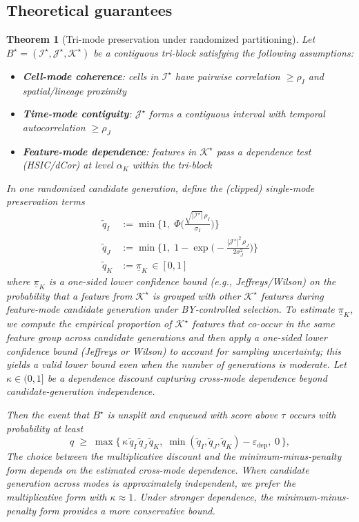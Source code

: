\documentclass[unnumsec,webpdf,modern,large,namedate]{oup-authoring-template}%
\theoremstyle{thmstyleone}\newtheorem{theorem}{Theorem}
\theoremstyle{thmstyletwo}\newtheorem{example}{Example}
\theoremstyle{thmstylethree}\newtheorem{definition}{Definition}
\begin{document}
\subsection{Theoretical guarantees}

\begin{theorem}[Tri-mode preservation under randomized partitioning]
\label{thm:trimode_preservation}
Let $B^\star=(\mathcal I^\star,\mathcal J^\star,\mathcal K^\star)$ be a contiguous tri-block satisfying the following assumptions:
\begin{itemize}
    \item[(A1)] \textbf{Cell-mode coherence}: cells in $\mathcal{I}^\star$ have pairwise correlation $\geq \rho_I$ and spatial/lineage proximity
    \item[(A2)] \textbf{Time-mode contiguity}: $\mathcal{J}^\star$ forms a contiguous interval with temporal autocorrelation $\geq \rho_J$
    \item[(A3)] \textbf{Feature-mode dependence}: features in $\mathcal{K}^\star$ pass a dependence test (HSIC/dCor) at level $\alpha_K$ within the tri-block
\end{itemize}

In one randomized candidate generation, define the (clipped) single-mode preservation terms
\begin{align}
\tilde q_I &:= \min\!\Big\{1,\; \Phi\!\Big(\tfrac{\sqrt{|\mathcal{I}^\star|} \, \rho_I}{\sigma_I}\Big)\Big\} \\
\tilde q_J &:= \min\!\Big\{1,\; 1 - \exp\!\Big(-\tfrac{|\mathcal{J}^\star|^2 \, \rho_J}{2\sigma_J^2}\Big)\Big\} \\
\tilde q_K &:= \underline{\pi}_K\,\in[0,1]
\end{align}
where $\underline{\pi}_K$ is a one-sided lower confidence bound (e.g., Jeffreys/Wilson) on the probability that a feature from $\mathcal{K}^\star$ is grouped with other $\mathcal{K}^\star$ features during feature-mode candidate generation under BY-controlled selection. To estimate $\underline{\pi}_K$, we compute the empirical proportion of $\mathcal{K}^\star$ features that co-occur in the same feature group across candidate generations and then apply a one-sided lower confidence bound (Jeffreys or Wilson) to account for sampling uncertainty; this yields a valid lower bound even when the number of generations is moderate. Let $\kappa\in(0,1]$ be a dependence discount capturing cross-mode dependence beyond candidate-generation independence.

Then the event that $B^\star$ is unsplit and enqueued with score above $\tau$ occurs with probability at least
\begin{equation}
q \;\ge\; \max\Big\{\, \kappa\, \tilde q_I\, \tilde q_J\, \tilde q_K,\; \min(\tilde q_I,\tilde q_J,\tilde q_K) - \varepsilon_{\mathrm{dep}},\; 0\,\Big\},
\label{eq:q_lower}
\end{equation}
The choice between the multiplicative discount and the minimum-minus-penalty form depends on the estimated cross-mode dependence. When candidate generation across modes is approximately independent, we prefer the multiplicative form with $\kappa\approx 1$. Under stronger dependence, the minimum-minus-penalty form provides a more conservative bound. 


\end{theorem}
\end{document}
